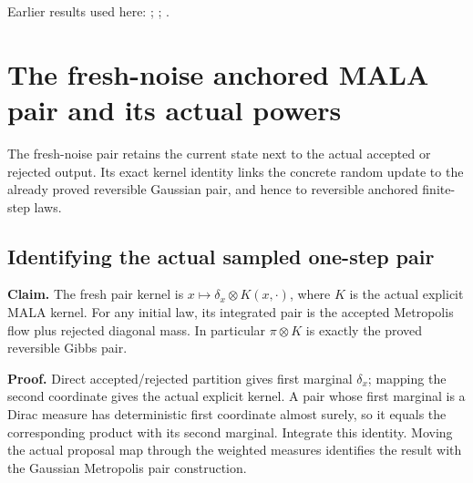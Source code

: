 \documentclass[11pt,a4paper]{report}
\begin{document}
Earlier results used here: \cite[Section~3.20.1]{LangevinLean2026ULASC}; \cite[Section~3.20.3]{LangevinLean2026ULASC}; \cite[Section~3.33.5]{LangevinLean2026ULASC}.
\section{\texorpdfstring{The fresh-noise anchored MALA pair and its actual powers}{The fresh-noise anchored MALA pair and its actual powers}}
\label{proof-module-WassersteinMixing-SemigroupMALAPair-lean}


The fresh-noise pair retains the current state next to the actual accepted or rejected output. Its exact kernel identity links the concrete random update to the already proved reversible Gaussian pair, and hence to reversible anchored finite-step laws.

\subsection{\texorpdfstring{Identifying the actual sampled one-step pair}{Identifying the actual sampled one-step pair}}
\label{report-step-WassersteinMixing-SemigroupMALAPair-lean-1}


\textbf{Claim.} The fresh pair kernel is \(x\mapsto\delta_x\otimes K(x,\cdot)\), where \(K\) is the actual explicit MALA kernel. For any initial law, its integrated pair is the accepted Metropolis flow plus rejected diagonal mass. In particular \(\pi\otimes K\) is exactly the proved reversible Gibbs pair.



\textbf{Proof.} Direct accepted/\allowbreak{}rejected partition gives first marginal \(\delta_x\); mapping the second coordinate gives the actual explicit kernel. A pair whose first marginal is a Dirac measure has deterministic first coordinate almost surely, so it equals the corresponding product with its second marginal. Integrate this identity. Moving the actual proposal map through the weighted measures identifies the result with the Gaussian Metropolis pair construction.
\end{document}
